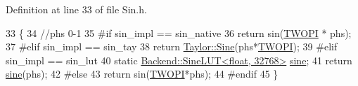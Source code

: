 Definition at line 33 of file Sin.\+h.


\begin{DoxyCode}
33                                         \{
34         \textcolor{comment}{//phs 0-1}
35 \textcolor{preprocessor}{#if sin\_impl == sin\_native}
36         \textcolor{keywordflow}{return} sin(\hyperlink{Sin_8h_a4912c64aec0c943b7985db6cb61ff83a}{TWOPI} * phs);
37 \textcolor{preprocessor}{#elif sin\_impl == sin\_tay}
38         \textcolor{keywordflow}{return} \hyperlink{namespaceBackend_1_1Backend_1_1Taylor_ad3bf02e59dbfb83f2b1362f84d2095b8}{Taylor::Sine}(phs*\hyperlink{Sin_8h_a4912c64aec0c943b7985db6cb61ff83a}{TWOPI});
39 \textcolor{preprocessor}{#elif sin\_impl == sin\_lut}
40         \textcolor{keyword}{static} \hyperlink{classBackend_1_1SineLUT}{Backend::SineLUT<float, 32768>} \hyperlink{namespaceSignal_1_1Fourier_ab1bf3cdef768a49cf3e927b9daf7da9d}{sine};
41         \textcolor{keywordflow}{return} \hyperlink{namespaceSignal_1_1Fourier_ab1bf3cdef768a49cf3e927b9daf7da9d}{sine}(phs);
42 \textcolor{preprocessor}{#else}
43         \textcolor{keywordflow}{return} sin(\hyperlink{Sin_8h_a4912c64aec0c943b7985db6cb61ff83a}{TWOPI}*phs);
44 \textcolor{preprocessor}{#endif}
45     \}
\end{DoxyCode}
